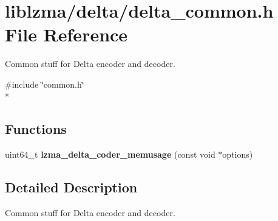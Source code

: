 \section{liblzma/delta/delta\-\_\-common.h File Reference}
\label{delta__common_8h}


Common stuff for Delta encoder and decoder.  


{\ttfamily \#include \char`\"{}common.\-h\char`\"{}}\\*
\subsection*{Functions}
\begin{DoxyCompactItemize}
\item 
uint64\-\_\-t {\bfseries lzma\-\_\-delta\-\_\-coder\-\_\-memusage} (const void $\ast$options)\label{delta__common_8h_aa2e090c4f9f8f30d83007a5f2053bf9f}

\end{DoxyCompactItemize}


\subsection{Detailed Description}
Common stuff for Delta encoder and decoder. 